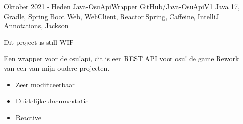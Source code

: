 \documentclass[letterpaper]{twentysecondcv} %
\begin{document}
    \begin{twenty} %
        \twentyitem
        {Oktober 2021 -}
        {Heden}
        {Java-OsuApiWrapper}
        {\href{https://github.com/Tais993/Java-OsuApiV1/}{GitHub/Java-OsuApiV1}}
        {Java 17, Gradle, Spring Boot Web, WebClient, Reactor Spring, Caffeine, IntelliJ Annotations, Jackson}
        {
            Dit project is still WIP

            Een wrapper voor de osu!api, dit is een REST API voor osu! de game
        Rework van een van mijn oudere projecten.
            \begin{itemize}
                \item Zeer modificeerbaar
                \item Duidelijke documentatie
                \item Reactive
            \end{itemize}}\\
    \end{twenty}

    \newpage

    \makesidebarSecond %

\end{document}
